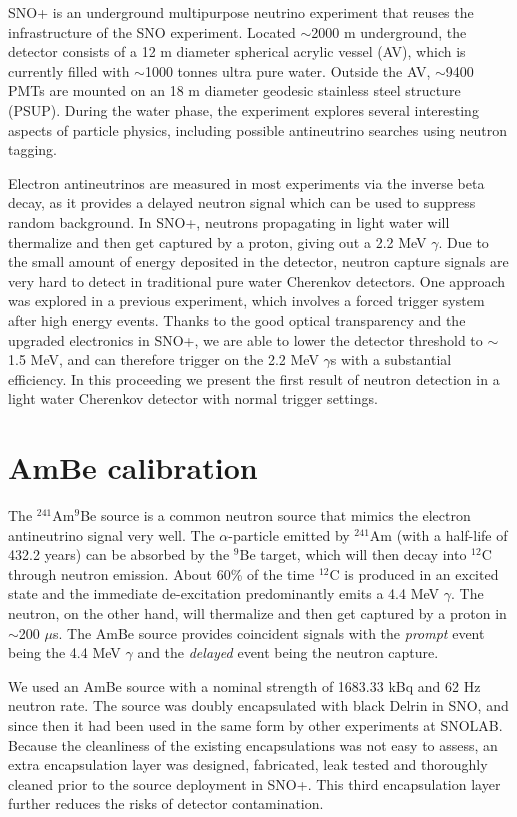 \documentclass[a4paper]{jpconf}
\begin{document}
SNO+\cite{Andringa:2015tza} is an underground multipurpose neutrino experiment that reuses the infrastructure of the SNO experiment. Located $\sim$2000 m underground, the detector consists of a 12 m diameter spherical acrylic vessel (AV), which is currently filled with $\sim$1000 tonnes ultra pure water. Outside the AV, $\sim$9400 PMTs are mounted on an 18 m diameter geodesic stainless steel structure (PSUP). During the water phase, the experiment explores several interesting aspects of particle physics, including possible antineutrino searches using neutron tagging.

Electron antineutrinos are measured in most experiments via the inverse beta decay, as it provides a delayed neutron signal which can be used to suppress random background. In SNO+, neutrons propagating in light water will thermalize and then get captured by a proton, giving out a 2.2 MeV $\gamma$. Due to the small amount of energy deposited in the detector, neutron capture signals are very hard to detect in traditional pure water Cherenkov detectors. One approach\cite{Watanabe:2008ru} was explored in a previous experiment, which involves a forced trigger system after high energy events. Thanks to the good optical transparency and the upgraded electronics in SNO+, we are able to lower the detector threshold to $\sim$1.5 MeV, and can therefore trigger on the 2.2 MeV $\gamma$s with a substantial efficiency. In this proceeding we present the first result of neutron detection in a light water Cherenkov detector with normal trigger settings. 


\section{AmBe calibration}


The $^{241}$Am$^{9}$Be source is a common neutron source that mimics the electron antineutrino signal very well. The $\alpha$-particle emitted by $^{241}$Am (with a half-life of 432.2 years) can be absorbed by the $^{9}$Be target, which will then decay into $^{12}$C through neutron emission. About 60\% of the time $^{12}$C is produced in an excited state and the immediate de-excitation predominantly emits a 4.4 MeV $\gamma$. The neutron, on the other hand, will thermalize and then get captured by a proton in $\sim$200 $\mu$s. The AmBe source provides coincident signals with the \textit{prompt} event being the 4.4 MeV $\gamma$ and the \textit{delayed} event being the neutron capture.

We used an AmBe source with a nominal strength of 1683.33 kBq and 62 Hz neutron rate\cite{jloach2009:diss}. The source was doubly encapsulated with black Delrin in SNO, and since then it had been used in the same form by other experiments at SNOLAB. Because the cleanliness of the existing encapsulations was not easy to assess, an extra encapsulation layer was designed, fabricated, leak tested and thoroughly cleaned prior to the source deployment in SNO+. This third encapsulation layer further reduces the risks of detector contamination.
\end{document}
